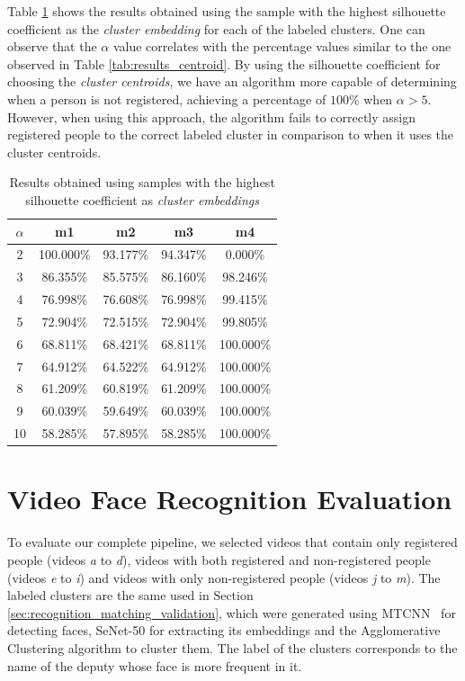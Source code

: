 Table \ref{tab:results_silhouette} shows the results obtained using the sample with the highest silhouette coefficient as the \emph{cluster embedding} for each of the labeled clusters.
One can observe that the $\alpha$ value correlates with the percentage values similar to the one observed in Table \ref{tab:results_centroid}.
By using the silhouette coefficient for choosing the \emph{cluster centroids}, we have an algorithm more capable of determining when a person is not registered, achieving a percentage of $100\%$ when $\alpha>5$.
However, when using this approach, the algorithm fails to correctly assign registered people to the correct labeled cluster in comparison to when it uses the cluster centroids.

\begin{table}[!ht]
\centering
\small
\caption{Results obtained using samples with the highest silhouette coefficient as \emph{cluster embeddings}}
\label{tab:results_silhouette}
\begin{tabular}{ccccc}
\hline
\textbf{$\alpha$} & \textbf{m1} & \textbf{m2} & \textbf{m3} & \textbf{m4} \\ \hline
2 & 100.000\% & 93.177\% & 94.347\% & 0.000\% \\
3 & 86.355\% & 85.575\% & 86.160\% & 98.246\% \\
4 & 76.998\% & 76.608\% & 76.998\% & 99.415\% \\
5 & 72.904\% & 72.515\% & 72.904\% & 99.805\% \\
6 & 68.811\% & 68.421\% & 68.811\% & 100.000\% \\
7 & 64.912\% & 64.522\% & 64.912\% & 100.000\% \\
8 & 61.209\% & 60.819\% & 61.209\% & 100.000\% \\
9 & 60.039\% & 59.649\% & 60.039\% & 100.000\% \\
10 & 58.285\% & 57.895\% & 58.285\% & 100.000\%
\end{tabular}
\end{table}

\section{Video Face Recognition Evaluation}
\label{sec:recognition_video_evaluation}

To evaluate our complete pipeline, we selected videos that contain only registered people (videos \emph{a} to \emph{d}), videos with both registered and non-registered people (videos \emph{e} to \emph{i}) and videos with only non-registered people (videos \emph{j} to \emph{m}).
The labeled clusters are the same used in Section \ref{sec:recognition_matching_validation}, which were generated using MTCNN~\cite{mtcnn} for detecting faces, SeNet-50 for extracting its embeddings and the Agglomerative Clustering algorithm to cluster them. 
The label of the clusters corresponds to the name of the deputy whose face is more frequent in it.

